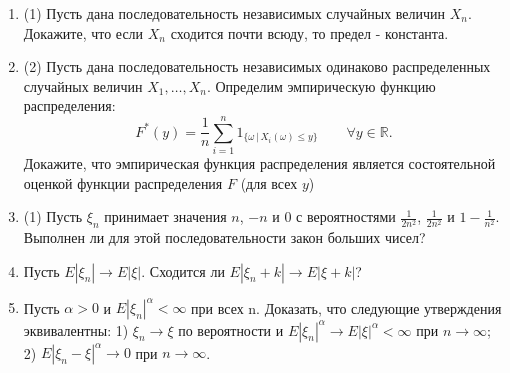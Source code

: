 \documentclass[a4paper, 14pt]{extarticle}
\begin{document}
\begin{enumerate}
\item (1) Пусть дана последовательность независимых случайных величин $X_n$. Докажите, что если $X_n$ сходится почти всюду, то предел - константа.

\item  (2) Пусть дана последовательность независимых одинаково распределенных случайных величин $X_1,\dots,X_n$.
	  Определим эмпирическую функцию распределения:
	  $$F^*(y)=\frac{1}{n}\sum_{i=1}^n 1_{\{\omega\,|\,X_i(\omega)\leq y\}}\qquad \forall y\in\mathbb{R}.$$
	  Докажите, что эмпирическая функция распределения является состоятельной оценкой функции распределения $F$ (для всех $y$)

\item (1) Пусть $\xi_n$ принимает значения $n$, $-n$ и $0$ с вероятностями $\frac{1}{2n^2}$, $\frac{1}{2n^2}$ и $1 - \frac{1}{n^2}$.
Выполнен ли для этой последовательности закон больших чисел? 

\item Пусть $E|\xi_n| \to E|\xi|$. Сходится ли $E|\xi_n + k| \to E|\xi+k|$?

\item Пусть $\alpha > 0$ и $E|\xi_n|^\alpha < \infty$ при всех n. Доказать, что следующие
утверждения эквивалентны:
1) $\xi_n \to \xi$ по вероятности и $E|\xi_n|^\alpha \to E|\xi|^\alpha < \infty$ при $n \to \infty$;
2) $E|\xi_n - \xi|^\alpha \to 0$ при $n \to \infty$. 







\end{enumerate}
\end{document}
